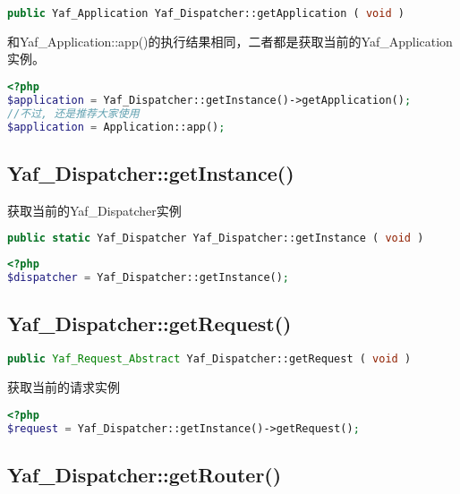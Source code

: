 \begin{lstlisting}[language=PHP]
public Yaf_Application Yaf_Dispatcher::getApplication ( void )
\end{lstlisting}

和Yaf\_Application::app()的执行结果相同，二者都是获取当前的Yaf\_Application实例。



\begin{lstlisting}[language=PHP]
<?php
$application = Yaf_Dispatcher::getInstance()->getApplication();
//不过, 还是推荐大家使用
$application = Application::app();
\end{lstlisting}





\subsection{Yaf\_Dispatcher::getInstance()}


获取当前的Yaf\_Dispatcher实例

\begin{lstlisting}[language=PHP]
public static Yaf_Dispatcher Yaf_Dispatcher::getInstance ( void )
\end{lstlisting}

\begin{lstlisting}[language=PHP]
<?php
$dispatcher = Yaf_Dispatcher::getInstance();
\end{lstlisting}

\subsection{Yaf\_Dispatcher::getRequest()}

\begin{lstlisting}[language=PHP]
public Yaf_Request_Abstract Yaf_Dispatcher::getRequest ( void )
\end{lstlisting}

获取当前的请求实例



\begin{lstlisting}[language=PHP]
<?php
$request = Yaf_Dispatcher::getInstance()->getRequest();
\end{lstlisting}



\subsection{Yaf\_Dispatcher::getRouter()}

